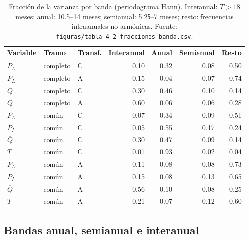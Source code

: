 \documentclass[11pt,letterpaper]{article}
\begin{document}
\begin{table}[H]
\centering\small
\caption{Fracción de la varianza por banda (periodograma Hann). Interanual: $T>18$ meses; anual: 10.5--14
meses; semianual: 5.25--7 meses; resto: frecuencias intraanuales no armónicas.
Fuente: \texttt{figuras/tabla\_4\_2\_fracciones\_banda.csv}.}
\label{tab:bandas}
\begin{tabular}{lllrrrr}
\toprule
Variable & Tramo & Transf. & Interanual & Anual & Semianual & Resto \\
\midrule
$P_L$ & completo & C & 0.10 & 0.32 & 0.08 & 0.50 \\
$P_L$ & completo & A & 0.15 & 0.04 & 0.07 & 0.74 \\
$\overline{Q}$ & completo & C & 0.30 & 0.46 & 0.10 & 0.14 \\
$\overline{Q}$ & completo & A & 0.60 & 0.06 & 0.06 & 0.28 \\
$P_L$ & común & C & 0.07 & 0.34 & 0.09 & 0.51 \\
$P_I$ & común & C & 0.05 & 0.55 & 0.17 & 0.24 \\
$\overline{Q}$ & común & C & 0.30 & 0.47 & 0.09 & 0.14 \\
$T$ & común & C & 0.01 & 0.93 & 0.02 & 0.04 \\
$P_L$ & común & A & 0.11 & 0.08 & 0.08 & 0.73 \\
$P_I$ & común & A & 0.15 & 0.08 & 0.13 & 0.65 \\
$\overline{Q}$ & común & A & 0.56 & 0.10 & 0.08 & 0.25 \\
$T$ & común & A & 0.21 & 0.07 & 0.12 & 0.60 \\
\bottomrule
\end{tabular}
\end{table}

\subsection{Bandas anual, semianual e interanual}
\end{document}
